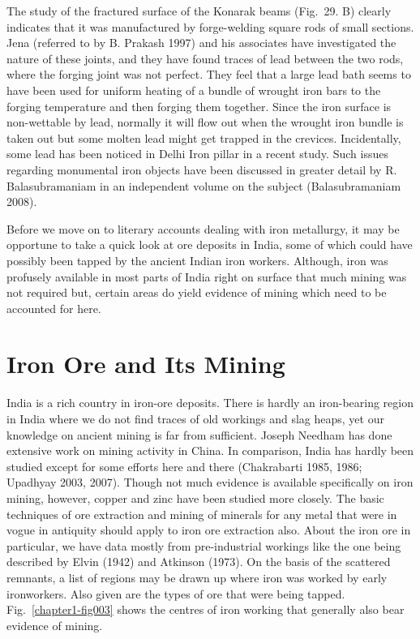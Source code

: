 The study of the fractured surface of the Konarak beams (Fig.~29. B) clearly indicates that it was manufactured by forge-welding square rods of small sections. Jena (referred to by B. Prakash 1997) and his associates have investigated the nature of these joints, and they have found traces of lead between the two rods, where the forging joint was not perfect. They feel that a large lead bath seems to have been used for uniform heating of a bundle of wrought iron bars to the forging temperature and then forging them together. Since the iron surface is non-wettable by lead, normally it will flow out when the wrought iron bundle is taken out but some molten lead might get trapped in the crevices. Incidentally, some lead has been noticed in Delhi Iron pillar in a recent study. Such issues regarding monumental iron objects have been discussed in greater detail by R. Balasubramaniam in an independent volume on the subject (Balasubramaniam 2008). 

Before we move on to literary accounts dealing with iron metallurgy, it may be opportune to take a quick look at ore deposits in India, some of which could have possibly been tapped by the ancient Indian iron workers. Although, iron was profusely available in most parts of India right on surface that much mining was not required but, certain areas do yield evidence of mining which need to be accounted for here.

\vspace{-.3cm}

\setcounter{section}{1}
\section{Iron Ore and Its Mining}\label{chapter4-section-2}

India is a rich country in iron-ore deposits. There is hardly an iron-bearing region in India where we do not find traces of old workings and slag heaps, yet our knowledge on ancient mining is far from sufficient. Joseph Needham has done extensive work on mining activity in China. In comparison, India has hardly been studied except for some efforts here and there (Chakrabarti 1985, 1986; Upadhyay 2003, 2007). Though not much evidence is available specifically on iron mining, however, copper and zinc have been studied more closely. The basic techniques of ore extraction and mining of minerals for any metal that were in vogue in antiquity should apply to iron ore extraction also. About the iron ore in particular, we have data mostly from pre-industrial workings like the one being described by Elvin (1942) and Atkinson (1973). On the basis of the scattered remnants, a list of regions may be drawn up where iron was worked by early ironworkers. Also given are the types of ore that were being tapped. Fig.~\ref{chapter1-fig003} shows the centres of iron working that generally also bear evidence of mining.

